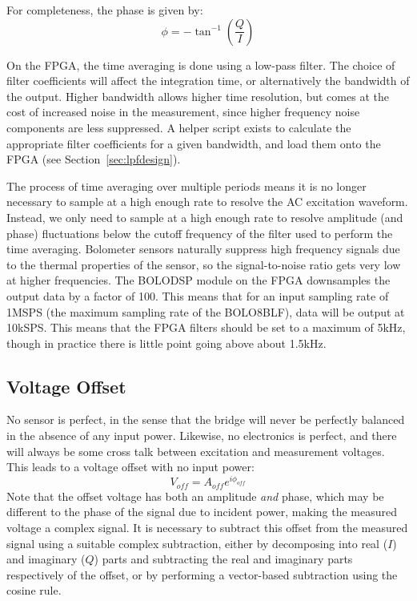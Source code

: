 \documentclass[12pt,a4paper]{article}
\begin{document}
For completeness, the phase is given by:
\begin{equation}
  \label{equ:phi}
  \phi = -\tan^{-1}\left(\frac{Q}{I}\right)
\end{equation}

On the FPGA, the time averaging is done using a low-pass filter. The choice of filter coefficients will affect the integration time, or alternatively the
bandwidth of the output. Higher bandwidth allows higher time resolution, but comes at the cost of increased noise in the measurement, since higher
frequency noise components are less suppressed. A helper script exists to calculate the appropriate filter coefficients for a given bandwidth, and load
them onto the FPGA (see Section~\ref{sec:lpfdesign}).

The process of time averaging over multiple periods means it is no longer necessary to sample at a high enough rate to resolve the AC excitation
waveform. Instead, we only need to sample at a high enough rate to resolve amplitude (and phase) fluctuations below the cutoff frequency of the filter
used to perform the time averaging. Bolometer sensors naturally suppress high frequency signals due to the thermal properties of the sensor, so the
signal-to-noise ratio gets very low at higher frequencies. The BOLODSP module on the FPGA downsamples the output data by a factor of 100. This
means that for an input sampling rate of 1MSPS (the maximum sampling rate of the BOLO8BLF), data will be output at 10kSPS\@. This means that the FPGA
filters should be set to a maximum of 5kHz, though in practice there is little point going above about 1.5kHz.

\subsection{Voltage Offset}
\label{sec:offset}
No sensor is perfect, in the sense that the bridge will never be perfectly balanced in the absence of any input power. Likewise, no electronics is perfect,
and there will always be some cross talk between excitation and measurement voltages. This leads to a voltage offset with no input power:
\begin{equation}
  \label{equ:voff}
  V_{off} = A_{off}e^{i\phi_{off}}
\end{equation}
Note that the offset voltage has both an amplitude \textit{and} phase, which may be different to the phase of the signal due to incident power, making the
measured voltage a complex signal. It is necessary to subtract this offset from the measured signal using a suitable complex subtraction, either by
decomposing into real ($I$) and imaginary ($Q$) parts and subtracting the real and imaginary parts respectively of the offset, or by performing a
vector-based subtraction using the cosine rule.
\end{document}

